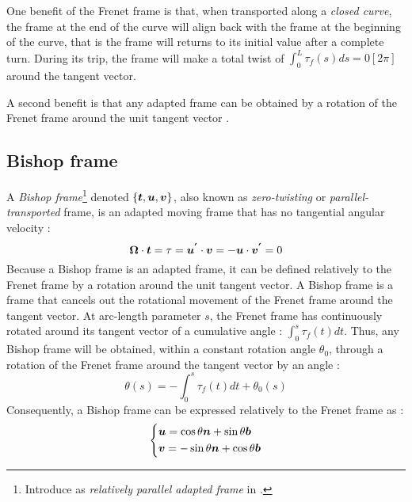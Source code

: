 One benefit of the Frenet frame is that, when transported along a \emph{closed curve}, the frame at the end of the curve will align back with the frame at the beginning of the curve, that is the frame will returns to its initial value after a complete turn. During its trip, the frame will make a total twist of $\int_0^L \tau_f(s)ds = 0[2\pi]$ around the tangent vector.

A second benefit is that any adapted frame can be obtained by a rotation of the Frenet frame around the unit tangent vector \cite[p.2]{Guggenheimer1989}.

\subsection{Bishop frame}\label{sec:bishop}

A \emph{Bishop frame}\footnote{Introduce as \emph{relatively parallel adapted frame} in \cite{Bishop}.} denoted $\{\boldsymbol{t},\boldsymbol{u},\boldsymbol{v}\}$, also known as \emph{zero-twisting} or \emph{parallel-transported} frame, is an adapted moving frame that has no tangential angular velocity :
\begin{equation}
	\boldsymbol{\Omega} \cdot \boldsymbol{t} = \tau =\boldsymbol{u^{'}} \cdot \boldsymbol{v} = - \boldsymbol{u} \cdot \boldsymbol{v^{'}} = 0
\end{equation}
Because a Bishop frame is an adapted frame, it can be defined relatively to the Frenet frame by a rotation around the unit tangent vector. A Bishop frame is a frame that cancels out the rotational movement of the Frenet frame around the tangent vector. At arc-length parameter $s$, the Frenet frame has continuously rotated around its tangent vector of a cumulative angle : $\int_0^s \tau_f(t)dt$. Thus, any Bishop frame will be obtained, within a constant rotation angle $\theta_0$, through a rotation of the Frenet frame around the tangent vector by an angle :
\begin{equation}
	\theta(s)  =  - \int_0^s \tau_f(t)dt + \theta_0(s)
\end{equation}
Consequently, a Bishop frame can be expressed relatively to the Frenet frame as :
\begin{equation}
	\left\{
	\begin{aligned}
		&\boldsymbol{u} = \cos \theta \boldsymbol{n} +  \sin \theta \boldsymbol{b}\\
		&\boldsymbol{v} = -\sin \theta \boldsymbol{n} +  \cos \theta \boldsymbol{b}
	\end{aligned}
	\right.
\end{equation}
